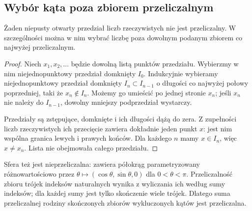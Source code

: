 \subsection{Wybór kąta poza zbiorem przeliczalnym}
\begin{lemat}\label{lem:nieprzeliczalnosc}
Żaden niepusty otwarty przedział liczb rzeczywistych nie jest przeliczalny. W szczególności można w nim wybrać liczbę poza dowolnym podanym zbiorem co najwyżej przeliczalnym.
\end{lemat}
\begin{proof}
Niech $x_1,x_2,\ldots$ będzie dowolną listą punktów przedziału. Wybierzmy w nim niejednopunktowy przedział domknięty $I_0$. Indukcyjnie wybieramy niejednopunktowy przedział domknięty $I_n\subset I_{n-1}$ o długości co najwyżej połowy poprzedniej, taki że $x_n\notin I_n$. Możemy go umieścić po jednej stronie $x_n$; jeśli $x_n$ nie należy do $I_{n-1}$, dowolny mniejszy podprzedział wystarczy.

Przedziały są zstępujące, domknięte i ich długości dążą do zera. Z zupełności liczb rzeczywistych ich przecięcie zawiera dokładnie jeden punkt $x$: jest nim wspólna granica lewych i prawych końców. Dla każdego $n$ mamy $x\in I_n$, więc $x\ne x_n$. Lista nie obejmowała całego przedziału.
\end{proof}
Sfera też jest nieprzeliczalna: zawiera półokrąg parametryzowany różnowartościowo przez $\theta\mapsto(\cos\theta,\sin\theta,0)$ dla $0<\theta<\pi$. Przeliczalność zbioru trójek indeksów naturalnych wynika z wyliczania ich według sumy indeksów; dla każdej sumy jest tylko skończenie wiele trójek. Dlatego suma przeliczalnej rodziny skończonych zbiorów wykluczonych kątów jest przeliczalna.

